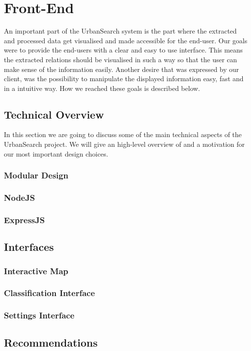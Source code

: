 \section{Front-End}
An important part of the UrbanSearch system is the part where the extracted and processed data get visualised and made accessible for the end-user. Our goals were to provide the end-users with a clear and easy to use interface. This means the extracted relations should be visualised in such a way so that the user can make sense of the information easily. Another desire that was expressed by our client, was the possibility to manipulate the displayed information easy, fast and in a intuitive way. How we reached these goals is described below.

\subsection{Technical Overview}
In this section we are going to discuss some of the main technical aspects of the UrbanSearch project. We will give an high-level overview of and a motivation for our most important design choices.

\subsubsection{Modular Design}
\subsubsection{NodeJS}
\subsubsection{ExpressJS}


\subsection{Interfaces}
\subsubsection{Interactive Map}
\subsubsection{Classification Interface}
\subsubsection{Settings Interface}

\subsection{Recommendations}